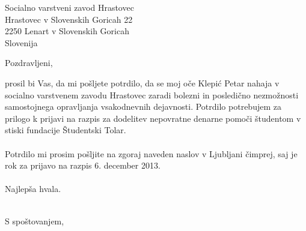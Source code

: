 \documentclass[a4paper]{scrlttr2}
\begin{document}
 
\begin{letter}{Socialno varstveni zavod Hrastovec \\ Hrastovec v Slovenskih Goricah 22 \\ 2250 Lenart v Slovenskih Goricah \\ Slovenija}
 

\opening{Pozdravljeni,}
 
prosil bi Vas, da mi pošljete potrdilo, da se moj oče Klepić Petar nahaja v socialno varstvenem zavodu Hrastovec zaradi bolezni in posledično nezmožnosti samostojnega opravljanja vsakodnevnih dejavnosti. 
Potrdilo potrebujem za prilogo k prijavi na razpis za dodelitev nepovratne denarne pomoči študentom v stiski fundacije Študentski Tolar.
\\
\\
Potrdilo mi prosim pošljite na zgoraj naveden naslov v Ljubljani čimprej, saj je rok za prijavo na razpis 6. december 2013.
\\
\\
Najlepša hvala.
\\
\\
\closing{S spoštovanjem,}

 
\end{letter}
 
\end{document}
